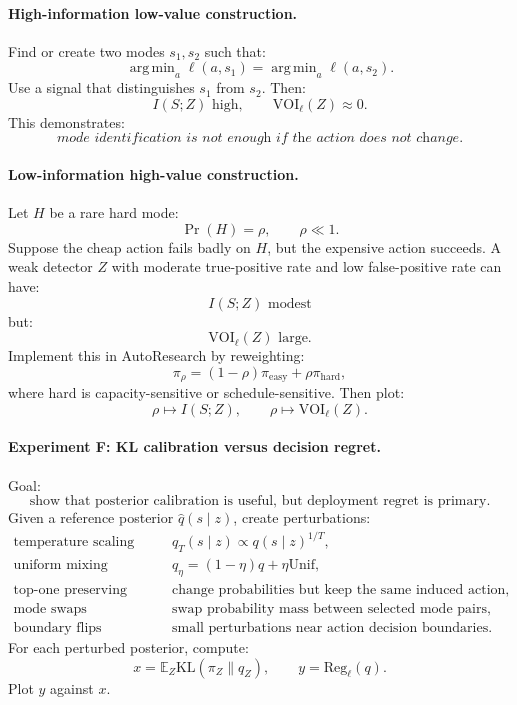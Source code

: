\documentclass{article}
\newcommand{\KL}{\mathrm{KL}}
\DeclareMathOperator*{\argmin}{arg\,min}
\begin{document}
\paragraph{High-information low-value construction.}
Find or create two modes \(s_1,s_2\) such that:
\[
    \argmin_a\ell(a,s_1)=\argmin_a\ell(a,s_2).
\]
Use a signal that distinguishes \(s_1\) from \(s_2\).
Then:
\[
    I(S;Z)\text{ high},
    \qquad
    \mathrm{VOI}_\ell(Z)\approx 0.
\]
This demonstrates:
\[
    \textit{mode identification is not enough if the action does not change.}
\]

\paragraph{Low-information high-value construction.}
Let \(H\) be a rare hard mode:
\[
    \Pr(H)=\rho,\qquad \rho\ll 1.
\]
Suppose the cheap action fails badly on \(H\), but the expensive action succeeds.
A weak detector \(Z\) with moderate true-positive rate and low false-positive rate can have:
\[
    I(S;Z)\text{ modest}
\]
but:
\[
    \mathrm{VOI}_\ell(Z)\text{ large}.
\]
Implement this in AutoResearch by reweighting:
\[
    \pi_\rho=(1-\rho)\pi_{\mathrm{easy}}+\rho\pi_{\mathrm{hard}},
\]
where hard is capacity-sensitive or schedule-sensitive.
Then plot:
\[
    \rho\mapsto I(S;Z),
    \qquad
    \rho\mapsto \mathrm{VOI}_\ell(Z).
\]

\paragraph{Experiment F: KL calibration versus decision regret.}
Goal:
\[
    \text{show that posterior calibration is useful, but deployment regret is primary.}
\]
Given a reference posterior \(\hat q(s\mid z)\), create perturbations:
\[
\begin{array}{ll}
    \text{temperature scaling} &
    q_T(s\mid z)\propto q(s\mid z)^{1/T},\\
    \text{uniform mixing} &
    q_\eta=(1-\eta)q+\eta\mathrm{Unif},\\
    \text{top-one preserving noise} &
    \text{change probabilities but keep the same induced action},\\
    \text{mode swaps} &
    \text{swap probability mass between selected mode pairs},\\
    \text{boundary flips} &
    \text{small perturbations near action decision boundaries}.
\end{array}
\]
For each perturbed posterior, compute:
\[
    x=\mathbb E_Z\KL(\pi_Z\|q_Z),
    \qquad
    y=\mathrm{Reg}_{\ell}(q).
\]
Plot \(y\) against \(x\).
\end{document}
